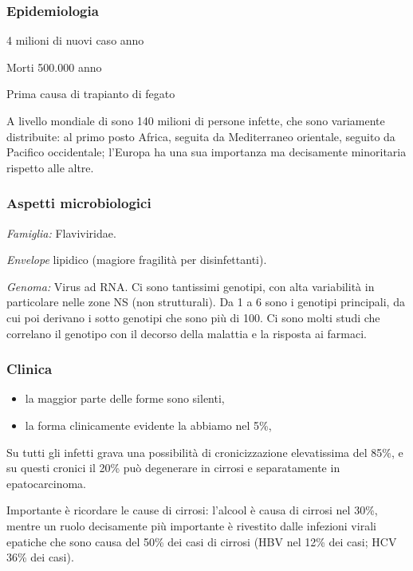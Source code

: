 \subsubsection{Epidemiologia}

  4 milioni di nuovi caso anno

  Morti 500.000 anno

  Prima causa di trapianto di fegato

  A livello mondiale di sono 140 milioni di persone infette, che sono
  variamente distribuite: al primo posto Africa, seguita da Mediterraneo
  orientale, seguito da Pacifico occidentale; l'Europa ha una sua
  importanza ma decisamente minoritaria rispetto alle altre.

\subsubsection{Aspetti microbiologici}

  \emph{\emph{Famiglia:}} Flaviviridae.

  \emph{\emph{Envelope}} lipidico (magiore fragilità per disinfettanti).

  \emph{\emph{Genoma:}} Virus ad RNA. Ci sono tantissimi genotipi, con
  alta variabilità in particolare nelle zone NS (non strutturali). Da 1
  a 6 sono i genotipi principali, da cui poi derivano i sotto genotipi
  che sono più di 100. Ci sono molti studi che correlano il genotipo con
  il decorso della malattia e la risposta ai farmaci.

\subsubsection{Clinica}

\begin{itemize}
\item
  la maggior parte delle forme sono silenti,
\item
  la forma clinicamente evidente la abbiamo nel 5\%,
\end{itemize}
  Su tutti gli infetti grava una possibilità di cronicizzazione
  elevatissima del 85\%, e su questi cronici il 20\% può degenerare in
  cirrosi e separatamente in epatocarcinoma.

  Importante è ricordare le cause di cirrosi: l'alcool è causa di
  cirrosi nel 30\%, mentre un ruolo decisamente più importante è
  rivestito dalle infezioni virali epatiche che sono causa del 50\% dei
  casi di cirrosi (HBV nel 12\% dei casi; HCV 36\% dei casi).

